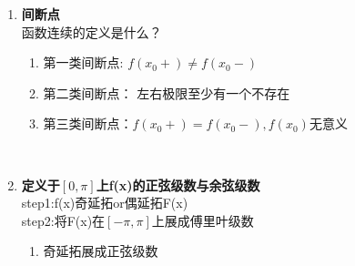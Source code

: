 \documentclass[12pt]{scrartcl}
\begin{document}
{\begin{enumerate}
    \begin{enumerate}
        \item f(x)在$[-\pi,\pi]$上连续或只有有限个第一类间断点
        \item f(x)在$[-\pi,\pi]$上上只有有限个极值点
    \end{enumerate}
    则函数f(x)可展开成三角级数$ \frac{a_0}{2}+\sum_{n = 1}^{\infty} (a_n \cos nx+b_n\sin nx)  $,
    其中系数计算公式为
    \begin{gather}
        a_0=\frac{1}{\pi}\int_{-\pi}^{\pi}f(x) \,dx \notag\\
        a_n=\frac{1}{\pi}\int_{-\pi}^{\pi}f(x)\cos nx \,dx \notag\\
        b_n=\frac{1}{\pi}\int_{-\pi}^{\pi}f(x)\sin nx \,dx \notag
    \end{gather}
    级数的收敛域为$(-\infty,\infty)$\\
    级数$ \frac{a_0}{2}+\sum_{n = 1}^{\infty} (a_n \cos nx+b_n\sin nx)  $与f(x)的关系：\\
    \begin{enumerate}
        \item 当x为f(x)的连续点时,$ \frac{a_0}{2}+\sum_{n = 1}^{\infty} (a_n \cos nx+b_n\sin nx) =f(x) $
        \item 当x为f(x)的间断点时,$ \frac{a_0}{2}+\sum_{n = 1}^{\infty} (a_n \cos nx+b_n\sin nx) =\frac{f(x-0)+f(x+0)}{2} $
    \end{enumerate}
~\\
    \item  \textbf{间断点}\\
    函数连续的定义是什么？
      \begin{enumerate}
          \item 第一类间断点: $f(x_0+)\neq f(x_0-)$ 
          \item 第二类间断点： 左右极限至少有一个不存在
          \item 第三类间断点：$f(x_0+)=f(x_0-),f(x_0)无意义$
      \end{enumerate}
~\\
    \item  \textbf{定义于$[0,\pi]$上f(x)的正弦级数与余弦级数}\\
    step1:\quad f(x)奇延拓or偶延拓F(x)\\
    step2:\quad 将F(x)在$[-\pi,\pi]$上展成傅里叶级数
    \begin{enumerate}
        \item 奇延拓展成正弦级数\\
        \begin{gather}

\end{gather}
\end{enumerate}
\end{enumerate}}
\end{document}
